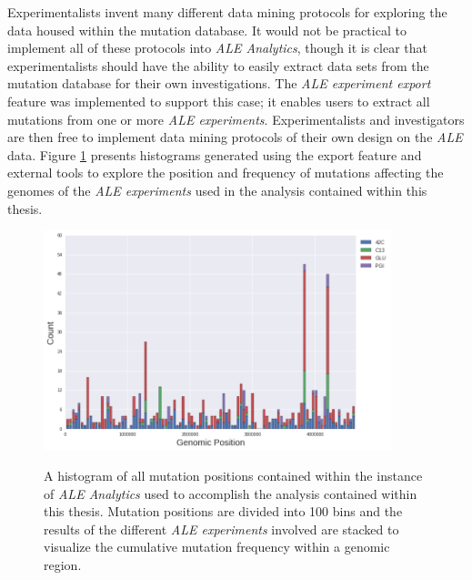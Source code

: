 \documentclass[12pt,final,masters,chapterheads]{ucsd}  %
\begin{document}
Experimentalists invent many different data mining protocols for exploring the data housed within the mutation database. It would not be practical to implement all of these protocols into \textit{ALE Analytics}, though it is clear that experimentalists should have the ability to easily extract data sets from the mutation database for their own investigations. The \textit{ALE experiment export} feature was implemented to support this case; it enables users to extract all mutations from one or more \textit{ALE experiments}. Experimentalists and investigators are then free to implement data mining protocols of their own design on the \textit{ALE} data. Figure \ref{fig:all_muts_topo} presents histograms generated using the export feature and external tools to explore the position and frequency of mutations affecting the genomes of the \textit{ALE experiments} used in the analysis contained within this thesis.
\begin{figure}[H]
  \caption{A histogram of all mutation positions contained within the instance of \textit{ALE Analytics} used to accomplish the analysis contained within this thesis. Mutation positions are divided into 100 bins and the results of the different \textit{ALE experiments} involved are stacked to visualize the cumulative mutation frequency within a genomic region.}
  \centering
  \includegraphics[width=0.9\textwidth]{all_muts_topo.png}
  \label{fig:all_muts_topo}
\end{figure}
\end{document}
